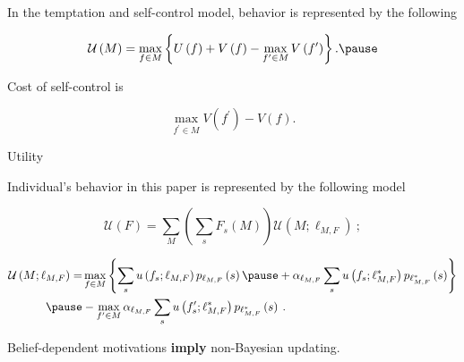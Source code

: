 \documentclass[usenames,dvipsnames,aspectratio=169,11pt, envcountsect]{beamer}
\begin{document}
\begin{frame}{\cite{gulTemptationSelfControl2001}}

	In the temptation and self-control model, behavior is represented by the following

	\vfill

	\[
		\mathcal{U} \left( M \right) = \max_{f \in M} \left\{ U \left( f \right) + V \left( f \right) - \max_{f^{\prime} \in M} V \left( f^{\prime} \right) \right\} . \pause
	\]

	\vfill

	Cost of self-control is

	\vfill

	\[
		\max_{f^{\prime} \in M} V \left( f^{\prime} \right) - V \left( f \right) .
	\]

\end{frame}

\begin{frame}{Utility}

	Individual's behavior in this paper is represented by the following model

	\vfill

	\begin{equation}\label{eq:contmenu1}
		\mathscr{U}(F)= \sum_{M} \left( \sum_{s} F_{s} \left( M \right) \right) \mathcal{U} \left(M ; \ell_{M, F} \right) \: ;
	\end{equation} \pause

	\vfill

	\begin{equation}\label{eq:menu1}
		\begin{aligned}
			\mathcal{U} \left(M ; \ell_{M, F} \right) = & \max _{f \in M}\left\{\sum_{s} u \left( f_{s} ; \ell_{M, F} \right) p_{\ell_{M, F}} \left( s \right) \pause +\alpha _{\ell_{M, F}} \sum_{s} u \left( f_{s} ; \ell^{*}_{M, F} \right) p_{\ell^{*}_{M, F}} \left( s \right) \right\} \\ \pause
			                                            & -\max _{f^{\prime} \in M} \alpha _{\ell_{M, F}} \sum_{s} u\left(f^{\prime}_{s} ; \ell^{*}_{M, F} \right) p_{\ell^{*}_{M, F}} \left( s \right) \: .
		\end{aligned}
	\end{equation}

	\vfill \pause

	Belief-dependent motivations \textbf{imply} non-Bayesian updating.

\end{frame}
\end{document}
